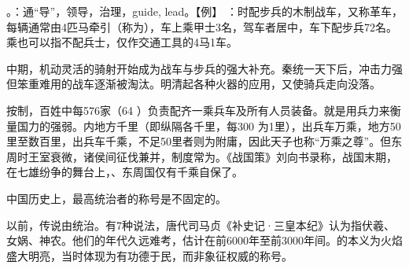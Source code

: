 {
\item {}。：通“导”，领导，治理，guide, lead。【例】 ：时配步兵的木制战车，又称革车，每辆通常由4匹马牵引（称为），车上乘甲士3名，驾车者居中，车下配步兵72名。乘也可以指不配兵士，仅作交通工具的4马1车。

中期，机动灵活的骑射开始成为战车与步兵的强大补充。秦统一天下后，冲击力强但笨重难用的战车逐渐被淘汰。明清起各种火器的应用，又使骑兵走向没落。

按制，百姓中每576家（64 ）负责配齐一乘兵车及所有人员装备。就是用兵力来衡量国力的强弱。内地方千里（即纵隔各千里，每300 为1里），出兵车万乘，地方50里至数百里，出兵车千乘，不足50里者则为附庸，因此天子也称“万乘之尊”。但东周时王室衰微，诸侯间征伐兼并，制度常为。《战国策》刘向书录称，战国末期，在七雄纷争的舞台上，、东周国仅有千乘自保了。

中国历史上，最高统治者的称号是不固定的。

\begin{lyenumerate}
\item {}以前，传说由统治。有7种说法，唐代司马贞《补史记·三皇本纪》认为指伏羲、女娲、神农。他们的年代久远难考，估计在前6000年至前3000年间。的本义为火焰盛大明亮，当时体现为有功德于民，而非象征权威的称号。


\end{lyenumerate}}
